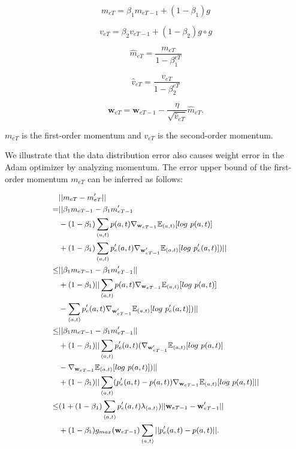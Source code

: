 \begin{equation}
    m_{eT}=\beta_1m_{eT-1}+(1-\beta_1)g
\end{equation}

\begin{equation}
    v_{eT}=\beta_2v_{eT-1}+(1-\beta_2)g\circ g
\end{equation}

\begin{equation}
    \hat m_{eT}=\frac{m_{eT}}{1-\beta_1^{eT}}
\end{equation}

\begin{equation}
    \hat v_{eT}=\frac{v_{eT}}{1-\beta_2^{eT}}
\end{equation}

\begin{equation}
    \mathbf w_{eT}=\mathbf w_{eT-1}-\frac{\eta}{\sqrt{\hat v_{eT}}}\hat m_{eT}.
\end{equation}

$m_{eT}$ is the first-order momentum and $v_{eT}$ is the second-order momentum.

We illustrate that the data distribution error also causes weight error in the Adam optimizer by analyzing momentum. The error upper bound of the first-order momentum $m_{eT}$ can be inferred as follows:

\begin{equation}
\small
\label{Eq:Adam error}
\begin{aligned}
&||m_{eT}-m'_{eT}||\\
=&||\beta_1m_{eT-1}-\beta_1m'_{eT-1}\\
&-(1-\beta_1)\sum_{(a,t)}p(a,t)\nabla_{\mathbf w_{eT-1}}\mathbb{E}_{(a,t)}[log\ p(a,t)]\\
&+(1-\beta_1)\sum_{(a,t)}p'_e(a,t)\nabla_{\mathbf w'_{eT-1}}\mathbb{E}_{(a,t)}[log\ p'_e(a,t)])||\\
\leq &||\beta_1m_{eT-1}-\beta_1m'_{eT-1}||\\
&+(1-\beta_1)||\sum_{(a,t)}p(a,t)\nabla_{\mathbf w_{eT-1}}\mathbb{E}_{(a,t)}[log\ p(a,t)]\\
&-\sum_{(a,t)}p'_e(a,t)\nabla_{\mathbf w'_{eT-1}}\mathbb{E}_{(a,t)}[log\ p'_e(a,t)])||\\
\leq&||\beta_1m_{eT-1}-\beta_1m'_{eT-1}||\\
&+(1-\beta_1)||\sum_{(a,t)}p'_e(a,t)(\nabla_{\mathbf w'_{eT-1}}\mathbb{E}_{(a,t)}[log\ p(a,t)]\\
&-\nabla_{\mathbf w_{eT-1}}\mathbb{E}_{(a,t)}[log\ p(a,t)])||\\
&+(1-\beta_1)||\sum_{(a,t)}(p'_e(a,t)-p(a,t))\nabla_{\mathbf w_{eT-1}}\mathbb{E}_{(a,t)}[log\ p(a,t)]||\\
\leq&(1+(1-\beta_1)\sum_{(a,t)}p'_e(a,t)\lambda_{(a,t)})||\mathbf w_{eT-1}-\mathbf w'_{eT-1}||\\
&+(1-\beta_1) g_{max}(\mathbf w_{eT-1})\sum_{(a,t)}||p'_e(a,t)-p(a,t)||.
\end{aligned}
\end{equation}


